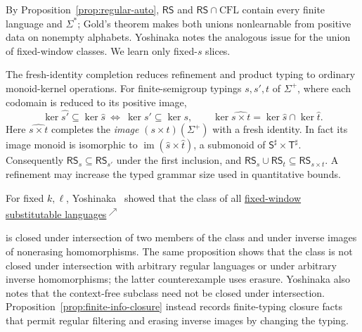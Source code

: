 \documentclass[11pt,a4paper]{article}
\newcommand{\fwdlink}[2]{%
  \hyperlink{#1}{#2\textsuperscript{\(\nearrow\)}}%
}
\theoremstyle{remark}
\theoremstyle{plain}
\begin{document}
By Proposition~\ref{prop:regular-auto}, $\mathsf{RS}$ and
$\mathsf{RS}\cap\mathrm{CFL}$ contain every finite language and
$\Sigma^*$; Gold's theorem makes both unions nonlearnable from
positive data on nonempty alphabets.  Yoshinaka
\cite[Section~4]{yoshinaka2008} notes the analogous issue for
the union of fixed-window classes.  We learn only fixed-$s$ slices.

The fresh-identity completion reduces refinement and
product typing to ordinary monoid-kernel operations.
For finite-semigroup typings $s,s',t$ of $\Sigma^+$,
where each codomain is reduced to its positive image,
\[
\ker\widehat{s'}\subseteq\ker\widehat s
\ \Longleftrightarrow\
\ker s'\subseteq\ker s,\qquad
\ker\widehat{s\times t}
=\ker\widehat s\cap\ker\widehat t.
\]
Here $\widehat{s\times t}$ completes the \emph{image}
$(s\times t)(\Sigma^+)$ with a fresh identity.
In fact its image monoid is isomorphic to
$\operatorname{im}(\widehat s\times\widehat t)$,
a submonoid of $\mathsf S^\sharp\times\mathsf T^\sharp$.
Consequently $\mathsf{RS}_s\subseteq\mathsf{RS}_{s'}$
under the first inclusion, and
$\mathsf{RS}_s\cup\mathsf{RS}_t
\subseteq\mathsf{RS}_{s\times t}$.
A refinement may increase the typed grammar size
used in quantitative bounds.

For fixed $k,\ell$, Yoshinaka~\cite[Proposition~1]{yoshinaka2008}
showed that the class of all
\fwdlink{def:kl-subst}{fixed-window substitutable languages}
is closed under intersection of two members of the class and under
inverse images of nonerasing homomorphisms.
The same proposition shows that the class is not closed under
intersection with arbitrary regular languages or under arbitrary
inverse homomorphisms; the latter counterexample uses erasure.
Yoshinaka also notes that the context-free subclass need not be
closed under intersection.
Proposition~\ref{prop:finite-info-closure} instead records
finite-typing closure facts that permit regular filtering and
erasing inverse images by changing the typing.
\end{document}
